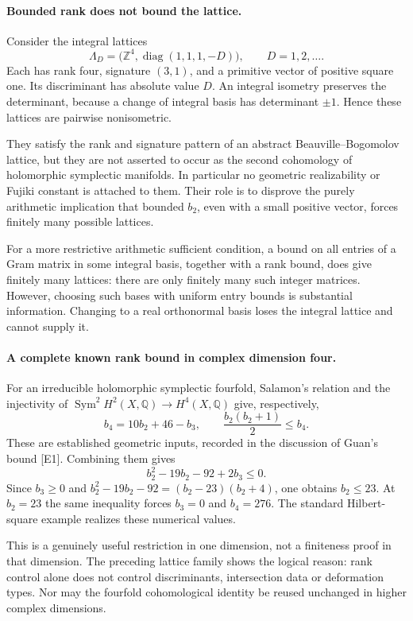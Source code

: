 \documentclass[11pt]{article}
\begin{document}
\paragraph{Bounded rank does not bound the lattice.}
Consider the integral lattices
\[
 \Lambda_D=\bigl(\mathbb Z^4,
                   \operatorname{diag}(1,1,1,-D)\bigr),
                         \qquad D=1,2,\ldots.
\]
Each has rank four, signature $(3,1)$, and a primitive
vector of positive square one. Its discriminant has
absolute value $D$. An integral isometry preserves
the determinant, because a change of integral basis
has determinant $\pm1$. Hence these lattices are
pairwise nonisometric.

They satisfy the rank and signature pattern of an
abstract Beauville--Bogomolov lattice, but they are
not asserted to occur as the second cohomology of
holomorphic symplectic manifolds. In particular no
geometric realizability or Fujiki constant is
attached to them. Their role is to disprove the
purely arithmetic implication that bounded
$b_2$, even with a small positive vector,
forces finitely many possible lattices.

For a more restrictive arithmetic sufficient
condition, a bound on all entries of a Gram
matrix in some integral basis, together with
a rank bound, does give finitely many lattices:
there are only finitely many such integer
matrices. However, choosing such bases with
uniform entry bounds is substantial information.
Changing to a real orthonormal basis loses
the integral lattice and cannot supply it.

\paragraph{A complete known rank bound in complex dimension four.}
For an irreducible holomorphic symplectic fourfold,
Salamon's relation and the injectivity of
$\operatorname{Sym}^2H^2(X,\mathbb Q)\to H^4(X,\mathbb Q)$
give, respectively,
\[
 b_4=10b_2+46-b_3,\qquad
              \frac{b_2(b_2+1)}2\leq b_4.
\]
These are established geometric inputs, recorded in
the discussion of Guan's bound [E1].
Combining them gives
\[
 b_2^2-19b_2-92+2b_3\leq0.
\]
Since $b_3\geq0$ and
$b_2^2-19b_2-92=(b_2-23)(b_2+4)$,
one obtains $b_2\leq23$. At $b_2=23$
the same inequality forces $b_3=0$ and
$b_4=276$. The standard Hilbert-square
example realizes these numerical values.

This is a genuinely useful restriction in one
dimension, not a finiteness proof in that
dimension. The preceding lattice family shows
the logical reason: rank control alone does
not control discriminants, intersection data
or deformation types. Nor may the fourfold
cohomological identity be reused unchanged
in higher complex dimensions.
\end{document}
